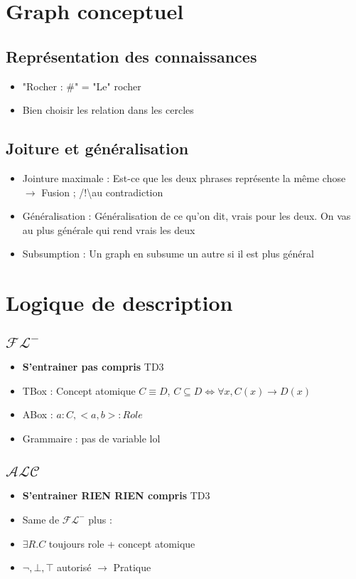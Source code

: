 \documentclass{article}
\theoremstyle{plain}%
\theoremstyle{definition}
\theoremstyle{remark}
\begin{document}
\section{Graph conceptuel}
\subsection{Représentation des connaissances}
\begin{itemize}
    \item "Rocher : \#" = "Le" rocher
    \item Bien choisir les relation dans les cercles
\end{itemize}
\subsection{Joiture et généralisation}
\begin{itemize}
    \item Jointure maximale : Est-ce que les deux phrases représente la même chose $\rightarrow$ Fusion ; /!\textbackslash au contradiction
    \item Généralisation : Généralisation de ce qu'on dit, vrais pour les deux. On vas au plus générale qui rend vrais les deux
    \item Subsumption : Un graph en subsume un autre si il est plus général
\end{itemize}

\section{Logique de description}
\subsection{$ \mathcal{FL}^- $ }
\begin{itemize}
    \item \textbf{S'entrainer pas compris} TD3
    \item TBox : Concept atomique $ C \equiv D $, $ C \subseteq D \Leftrightarrow \forall x, C(x) \to D(x)$ 
    \item ABox : $ a : C, <a,b> : Role $ 
    \item Grammaire : pas de variable lol
\end{itemize}
\subsection{$ \mathcal{ALC} $ }
\begin{itemize}
    \item \textbf{S'entrainer RIEN RIEN compris} TD3
    \item Same de $ \mathcal{FL}^- $ plus : 
    \item $ \exists R.C $ toujours role + concept atomique 
    \item $ \neg , \bot , \top  $ autorisé $\rightarrow$ Pratique
\end{itemize}
\end{document}
